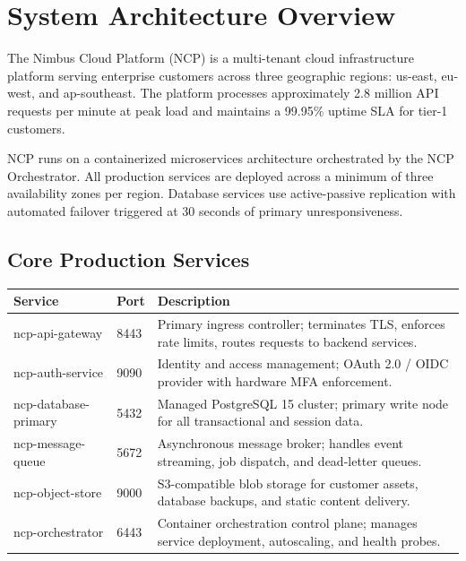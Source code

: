 \section{System Architecture Overview}

The Nimbus Cloud Platform (NCP) is a multi-tenant cloud infrastructure platform serving enterprise customers across three geographic regions: us-east, eu-west, and ap-southeast. The platform processes approximately 2.8 million API requests per minute at peak load and maintains a 99.95\% uptime SLA for tier-1 customers.

\begin{infobox}
NCP runs on a containerized microservices architecture orchestrated by the NCP Orchestrator. All production services are deployed across a minimum of three availability zones per region. Database services use active-passive replication with automated failover triggered at 30 seconds of primary unresponsiveness.
\end{infobox}

\subsection*{Core Production Services}

\begin{tabularx}{\textwidth}{llX}
\toprule
\textbf{Service} & \textbf{Port} & \textbf{Description} \\
\midrule
ncp-api-gateway       & 8443 & Primary ingress controller; terminates TLS, enforces rate limits, routes requests to backend services. \\
ncp-auth-service      & 9090 & Identity and access management; OAuth 2.0 / OIDC provider with hardware MFA enforcement. \\
ncp-database-primary  & 5432 & Managed PostgreSQL 15 cluster; primary write node for all transactional and session data. \\
ncp-message-queue     & 5672 & Asynchronous message broker; handles event streaming, job dispatch, and dead-letter queues. \\
ncp-object-store      & 9000 & S3-compatible blob storage for customer assets, database backups, and static content delivery. \\
ncp-orchestrator      & 6443 & Container orchestration control plane; manages service deployment, autoscaling, and health probes. \\
\bottomrule
\end{tabularx}
